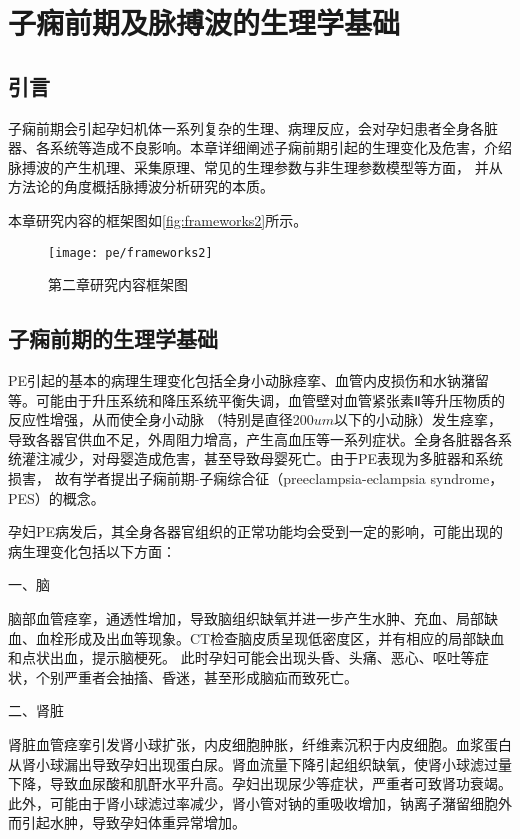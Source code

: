 \chapter{子痫前期及脉搏波的生理学基础}
\section{引言}
子痫前期会引起孕妇机体一系列复杂的生理、病理反应，会对孕妇患者全身各脏器、各系统等造成不良影响。本章详细阐述子痫前期引起的生理变化及危害，介绍脉搏波的产生机理、采集原理、常见的生理参数与非生理参数模型等方面，
并从方法论的角度概括脉搏波分析研究的本质。

本章研究内容的框架图如\autoref{fig:frameworks2}所示。
\begin{figure}[htbp]
    \centering
    \texttt{[image: pe/frameworks2]} 
    \caption{\label{fig:frameworks2}第二章研究内容框架图}
\end{figure}

\section{子痫前期的生理学基础}
PE引起的基本的病理生理变化包括全身小动脉痉挛、血管内皮损伤和水钠潴留等\cite{OAG9}。可能由于升压系统和降压系统平衡失调，血管壁对血管紧张素Ⅱ等升压物质的反应性增强，从而使全身小动脉
（特别是直径200$um$以下的小动脉）发生痉挛，导致各器官供血不足，外周阻力增高，产生高血压等一系列症状。全身各脏器各系统灌注减少，对母婴造成危害，甚至导致母婴死亡。由于PE表现为多脏器和系统损害，
故有学者提出子痫前期-子痫综合征（preeclampsia-eclampsia syndrome，PES）的概念\cite{OAG9}。

孕妇PE病发后，其全身各器官组织的正常功能均会受到一定的影响，可能出现的病生理变化包括以下方面\cite{OAG9}：

一、脑

脑部血管痉挛，通透性增加，导致脑组织缺氧并进一步产生水肿、充血、局部缺血、血栓形成及出血等现象。CT检查脑皮质呈现低密度区，并有相应的局部缺血和点状出血，提示脑梗死。
此时孕妇可能会出现头昏、头痛、恶心、呕吐等症状，个别严重者会抽搐、昏迷，甚至形成脑疝而致死亡。

二、肾脏

肾脏血管痉挛引发肾小球扩张，内皮细胞肿胀，纤维素沉积于内皮细胞。血浆蛋白从肾小球漏出导致孕妇出现蛋白尿。肾血流量下降引起组织缺氧，使肾小球滤过量下降，导致血尿酸和肌酐水平升高。孕妇出现尿少等症状，严重者可致肾功衰竭。
此外，可能由于肾小球滤过率减少，肾小管对钠的重吸收增加，钠离子潴留细胞外而引起水肿，导致孕妇体重异常增加。

